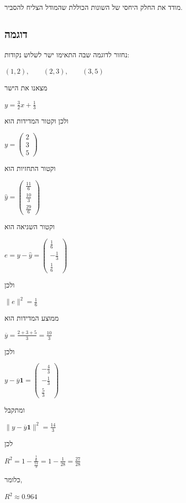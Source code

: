 \documentclass[12pt]{report}
\theoremstyle{plain}
\theoremstyle{definition}
\newcommand{\0}{\mathbf{0}}
\begin{document}
מודד את החלק היחסי של השונות הכוללת שהמודל הצליח להסביר.

\subsection*{דוגמה}

נחזור לדוגמה שבה התאימו ישר לשלוש נקודות:

$
(1,2),\qquad (2,3),\qquad (3,5)
$

מצאנו את הישר

$
y=\frac{3}{2}x+\frac{1}{3}
$

ולכן וקטור המדידות הוא

$
y=
\begin{pmatrix}
2\\
3\\
5
\end{pmatrix}
$

וקטור התחזיות הוא

$
\hat{y}=
\begin{pmatrix}
\frac{11}{6}\\
\frac{10}{3}\\
\frac{29}{6}
\end{pmatrix}
$

וקטור השגיאה הוא

$
e=y-\hat{y}
=
\begin{pmatrix}
\frac{1}{6}\\
-\frac{1}{3}\\
\frac{1}{6}
\end{pmatrix}
$

ולכן

$
\|e\|^2
=
\frac{1}{6}
$

ממוצע המדידות הוא

$
\overline{y}
=
\frac{2+3+5}{3}
=
\frac{10}{3}
$

ולכן

$
y-\overline{y}\mathbf{1}
=
\begin{pmatrix}
-\frac{4}{3}\\
-\frac{1}{3}\\
\frac{5}{3}
\end{pmatrix}
$

ומתקבל

$
\|y-\overline{y}\mathbf{1}\|^2
=
\frac{14}{3}
$

לכן

$
R^2
=
1-
\frac{\frac{1}{6}}{\frac{14}{3}}
=
1-\frac{1}{28}
=
\frac{27}{28}
$

כלומר,

$
R^2\approx 0.964
$
\end{document}
